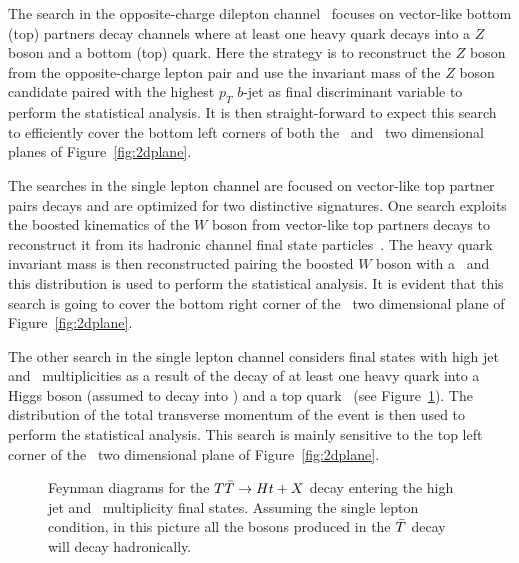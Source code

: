 The search in the opposite-charge dilepton channel~\cite{ATLAS-CONF-2013-056} 
focuses on vector-like bottom  (top) partners decay channels where at least one 
heavy quark decays into a $Z$ boson and a bottom (top) quark. 
Here the strategy is to reconstruct the $Z$ boson from the opposite-charge lepton
pair and use the invariant mass of the $Z$ boson candidate paired  with the highest 
$p_T$ $b$-jet as final discriminant variable to perform the statistical analysis.
It is then straight-forward to expect this search to efficiently cover the bottom
left corners of both the \BBbar\  and \TTbar\  two dimensional planes of
Figure~\ref{fig:2dplane}.


The searches in the single lepton channel are focused on vector-like top partner
pairs decays and are optimized for two distinctive signatures. One search
exploits the boosted kinematics of the $W$ boson from vector-like top partners decays
to reconstruct it from its hadronic channel final state 
particles~\cite{ATLAS-CONF-2013-060}. The heavy quark invariant mass is 
then reconstructed pairing the boosted  $W$ boson  with a \bjet\ and this
distribution is used to perform the statistical analysis. It is evident that this
search is going to cover the bottom right corner of the \TTbar\  two dimensional plane 
of Figure~\ref{fig:2dplane}.

The other search in the single lepton channel considers final states with high
jet and \bjet\ multiplicities as a result of the decay of at least one heavy quark
into a Higgs boson (assumed to decay into \bbbar) and a top 
quark~\cite{ATLAS-CONF-2013-018} (see Figure~\ref{fig:feyndHTX}). The distribution
of the  total transverse momentum of the event is then used to perform the statistical 
analysis. This search is mainly sensitive to the top left corner of the \TTbar\  
two dimensional plane of Figure~\ref{fig:2dplane}.


\begin{figure}[hbt]
\begin{center}
        \myskip\myskip
	\caption{Feynman diagrams for the $\TTbar\to Ht+X$
        decay entering the high jet and \bjet\ multiplicity final states.
        Assuming the single lepton condition, in this picture all the bosons 
        produced in the $\Tbar$ decay will decay hadronically.\label{fig:feyndHTX}}
\end{center}
\end{figure}



